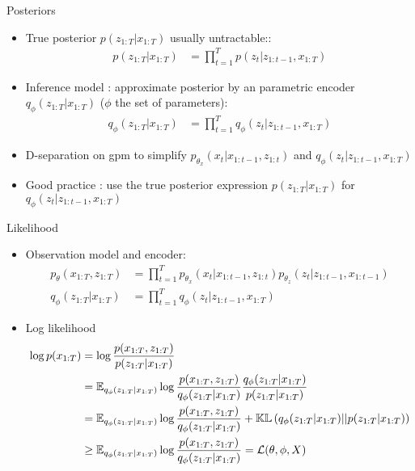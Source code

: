 \begin{frame}{Posteriors}
    \begin{itemize}
        \item <1-> True posterior  $p(z_{1:T} \vert x_{1:T})$ usually untractable::
            \begin{align*}
                p(z_{1:T} \vert x_{1:T}) &= \prod_{t=1}^T p(z_t \vert z_{1:t-1}, x_{1:T})
            \end{align*}
        \item <2-> Inference model : approximate posterior by an parametric encoder $q_{\phi}(z_{1:T} \vert x_{1:T})$ ($\phi$ the set of parameters):
            \begin{align*}
                q_{\phi}(z_{1:T} \vert x_{1:T}) &= \prod_{t=1}^T q_\phi(z_t \vert z_{1:t-1}, x_{1:T})
            \end{align*}
        \item <3-> D-separation on \gls{gpm} to simplify $p_{\theta_x}(x_t \vert x_{1:t-1}, z_{1:t})$ and $q_\phi(z_t \vert z_{1:t-1}, x_{1:T})$
        \item <4-> Good practice : use the true posterior expression $p(z_{1:T} \vert x_{1:T})$ for $q_\phi(z_t \vert z_{1:t-1}, x_{1:T})$
    \end{itemize}
\end{frame}

\begin{frame}{Likelihood}
    \begin{itemize}
        \item <1-> Observation model and encoder:
        \begin{align}
            p_{\theta}(x_{1:T}, z_{1:T}) &= \prod_{t=1}^T p_{\theta_x}(x_t \vert x_{1:t-1}, z_{1:t}) p_{\theta_z}(z_t \vert z_{1:t-1}, x_{1:t-1}) \\
            \label{q_phi_dev}
            q_\phi(z_{1:T} \vert x_{1:T}) &= \prod_{t=1}^T q_\phi (z_t \vert z_{1:t-1}, x_{1:T})
        \end{align}
        \item <2-> Log likelihood
        \begin{align}
            \log{p(x_{1:T})} &= \log{\frac{p(x_{1:T}, z_{1:T})}{p(z_{1:T} \vert x_{1:T})}} \\
            &= \mathbb{E}_{q_{\phi}(z_{1:T}\vert x_{1:T})} \log{\frac{p(x_{1:T}, z_{1:T})}{q_{\phi}(z_{1:T}\vert x_{1:T})} \frac{q_{\phi}(z_{1:T}\vert x_{1:T})}{p(z_{1:T} \vert x_{1:T})}} \\
            &= \mathbb{E}_{q_{\phi}(z_{1:T}\vert x_{1:T})} \log{\frac{p(x_{1:T}, z_{1:T})}{q_{\phi}(z_{1:T}\vert x_{1:T})} + \mathbb{KL}\left( q_{\phi}(z_{1:T}\vert x_{1:T}) \vert\vert p(z_{1:T} \vert x_{1:T}) \right)} \\
            &\geq \mathbb{E}_{q_{\phi}(z_{1:T}\vert x_{1:T})} \log{\frac{p(x_{1:T}, z_{1:T})}{q_{\phi}(z_{1:T}\vert x_{1:T})}} = \mathcal{L}(\theta, \phi, X)
        \end{align}
    \end{itemize}
\end{frame}

